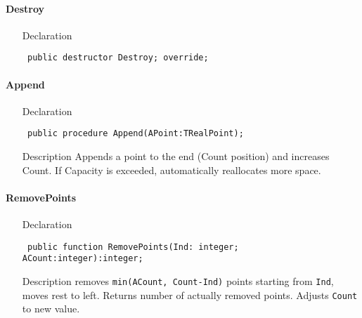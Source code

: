 \documentclass[12pt,a4paper,oneside]{report}
\newcommand{\declarationitem}[1]{{\addfontfeatures{FakeBold=1.3} #1}}
\newcommand{\descriptiontitle}[1]{{\addfontfeatures{FakeSlant}#1}}
\newcommand{\code}[1]{\texttt{#1}}
\begin{document}
\paragraph{Destroy}\hspace*{\fill}

\label{lmPointsVec.TPoints-Destroy}
\begin{itemize}\item[\declarationitem{Declaration}\hfill]
	\begin{flushleft}
		\code{
			public destructor Destroy; override;}
	\end{flushleft}
\end{itemize}
\paragraph{Append}\hspace*{\fill}
\label{lmPointsVec.TPoints-Append}
\begin{itemize}\item[\declarationitem{Declaration}\hfill]
	\begin{flushleft}
		\code{
			public procedure Append(APoint:TRealPoint);}
		
	\end{flushleft}
	
	\par
	\item[\descriptiontitle{Description}]
	Appends a point to the end (Count position) and increases Count. If Capacity is exceeded, automatically reallocates more space.
	
\end{itemize}
\paragraph{RemovePoints}\hspace*{\fill}

\label{lmPointsVec.TPoints-RemovePoints}
\begin{itemize}\item[\declarationitem{Declaration}\hfill]
	\begin{flushleft}
		\code{
			public function RemovePoints(Ind: integer; ACount:integer):integer;}
		
	\end{flushleft}
	
	\par
	\item[\descriptiontitle{Description}]
	removes \code{min(ACount, Count{-}Ind)} points starting from \code{Ind}, moves rest to left. Returns number of actually removed points. Adjusts \code{Count} to new value.
	
\end{itemize}
\end{document}
